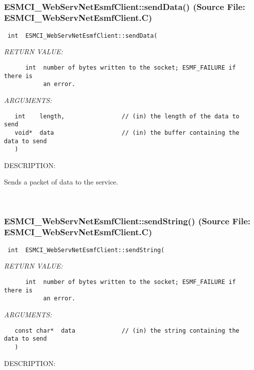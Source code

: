  
\mbox{}\hrulefill\
 
\subsubsection{ESMCI\_WebServNetEsmfClient::sendData() (Source File: ESMCI\_WebServNetEsmfClient.C)}


  
\begin{verbatim} int  ESMCI_WebServNetEsmfClient::sendData(\end{verbatim}{\em RETURN VALUE:}
\begin{verbatim}      int  number of bytes written to the socket; ESMF_FAILURE if there is
           an error.\end{verbatim}{\em ARGUMENTS:}
\begin{verbatim}   int    length,                // (in) the length of the data to send
   void*  data                   // (in) the buffer containing the data to send
   )\end{verbatim}
{\sf DESCRIPTION:\\ }


      Sends a packet of data to the service.
   
 
\mbox{}\hrulefill\
 
\subsubsection{ESMCI\_WebServNetEsmfClient::sendString() (Source File: ESMCI\_WebServNetEsmfClient.C)}


  
\begin{verbatim} int  ESMCI_WebServNetEsmfClient::sendString(\end{verbatim}{\em RETURN VALUE:}
\begin{verbatim}      int  number of bytes written to the socket; ESMF_FAILURE if there is
           an error.\end{verbatim}{\em ARGUMENTS:}
\begin{verbatim}   const char*  data             // (in) the string containing the data to send
   )\end{verbatim}
{\sf DESCRIPTION:\\ }


